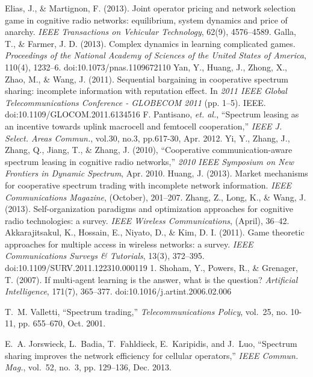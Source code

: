\begin{thebibliography}{}
 Elias, J., \& Martignon, F. (2013). Joint operator pricing and network selection game in cognitive radio networks: equilibrium, system dynamics and price of anarchy. \textit{IEEE Transactions on Vehicular Technology}, 62(9), 4576–4589. 
 Galla, T., \& Farmer, J. D. (2013). Complex dynamics in learning complicated games. \textit{Proceedings of the National Academy of Sciences of the United States of America}, 110(4), 1232–6. doi:10.1073/pnas.1109672110
 Yan, Y., Huang, J., Zhong, X., Zhao, M., \& Wang, J. (2011). Sequential bargaining in cooperative spectrum sharing: incomplete information with reputation effect. In \textit{2011 IEEE Global Telecommunications Conference - GLOBECOM 2011} (pp. 1–5). IEEE. doi:10.1109/GLOCOM.2011.6134516
 F. Pantisano, \textit{et. al.}, ``Spectrum leasing as an incentive towards uplink macrocell and femtocell cooperation,'' \textit{IEEE J. Select. Areas Commun.}, vol.30, no.3, pp.617-30, Apr. 2012.
 Yi, Y., Zhang, J., Zhang, Q., Jiang, T., \& Zhang, J. (2010), ``Cooperative communication-aware spectrum leasing in cognitive radio networks,'' \textit{2010 IEEE Symposium on New Frontiers in Dynamic Spectrum}, Apr. 2010.
 Huang, J. (2013). Market mechanisms for cooperative spectrum trading with incomplete network information. \textit{IEEE Communications Magazine}, (October), 201–207. 
 Zhang, Z., Long, K., \& Wang, J. (2013). Self-organization paradigms and optimization approaches for cognitive radio technologies: a survey. \textit{IEEE Wireless Communications}, (April), 36–42. 
 Akkarajitsakul, K., Hossain, E., Niyato, D., \& Kim, D. I. (2011). Game theoretic approaches for multiple access in wireless networks: a survey. \textit{IEEE Communications Surveys \& Tutorials}, 13(3), 372–395. doi:10.1109/SURV.2011.122310.000119
1. Shoham, Y., Powers, R., \& Grenager, T. (2007). If multi-agent learning is the answer, what is the question? \textit{Artificial Intelligence}, 171(7), 365–377. doi:10.1016/j.artint.2006.02.006

T.~M. Valletti, ``Spectrum trading,'' \emph{Telecommunications Policy},
  vol.~25, no. 10-11, pp. 655--670, Oct. 2001.

E.~A. Jorswieck, L.~Badia, T.~Fahldieck, E.~Karipidis, and J.~Luo, ``Spectrum
  sharing improves the network efficiency for cellular operators,''
  \emph{{IEEE} Commun. Mag.}, vol.~52, no.~3, pp. 129--136, Dec. 2013.


\end{thebibliography}
